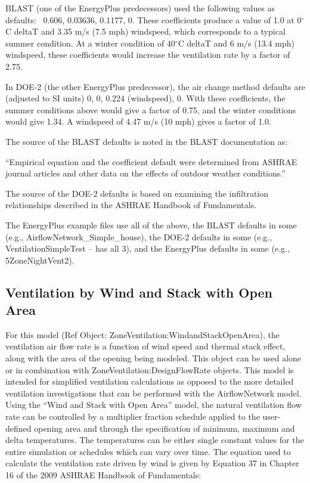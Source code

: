 BLAST (one of the EnergyPlus predecessors) used the following values as defaults:~ 0.606, 0.03636, 0.1177, 0. These coefficients produce a value of 1.0 at 0$^{\circ}$C deltaT and 3.35 m/s (7.5 mph) windspeed, which corresponds to a typical summer condition. At a winter condition of 40$^{\circ}$C deltaT and 6 m/s (13.4 mph) windspeed, these coefficients would increase the ventilation rate by a factor of 2.75.

In DOE-2 (the other EnergyPlus predecessor), the air change method defaults are (adjusted to SI units) 0, 0, 0.224 (windspeed), 0. With these coefficients, the summer conditions above would give a factor of 0.75, and the winter conditions would give 1.34. A windspeed of 4.47 m/s (10 mph) gives a factor of 1.0.

The source of the BLAST defaults is noted in the BLAST documentation as:

``Empirical equation and the coefficient default were determined from ASHRAE journal articles and other data on the effects of outdoor weather conditions.''

The source of the DOE-2 defaults is based on examining the infiltration relationships described in the ASHRAE Handbook of Fundamentals.

The EnergyPlus example files use all of the above, the BLAST defaults in some (e.g., AirflowNetwork\_Simple\_house), the DOE-2 defaults in some (e.g., VentilationSimpleTest -- has all 3), and the EnergyPlus defaults in some (e.g., 5ZoneNightVent2).

\subsection{Ventilation by Wind and Stack with Open Area}\label{ventilation-by-wind-and-stack-with-open-area}

For this model (Ref Object: ZoneVentilation:WindandStackOpenArea), the ventilation air flow rate is a function of wind speed and thermal stack effect, along with the area of the opening being modeled. This object can be used alone or in combination with ZoneVentilation:DesignFlowRate objects. This model is intended for simplified ventilation calculations as opposed to the more detailed ventilation investigations that can be performed with the AirflowNetwork model. Using the ``Wind and Stack with Open Area'' model, the natural ventilation flow rate can be controlled by a multiplier fraction schedule applied to the user-defined opening area and through the specification of minimum, maximum and delta temperatures. The temperatures can be either single constant values for the entire simulation or schedules which can vary over time. The equation used to calculate the ventilation rate driven by wind is given by Equation 37 in Chapter 16 of the 2009 ASHRAE Handbook of Fundamentals:

